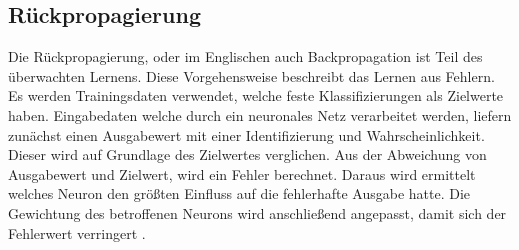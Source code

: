 \documentclass[a4paper,12pt,oneside]{article}
\begin{document}
\subsection{Rückpropagierung}
Die Rückpropagierung, oder im Englischen auch \glqq Backpropagation\grqq{} \cite{ertel2013grundkurs} ist Teil des überwachten Lernens. Diese Vorgehensweise beschreibt das Lernen aus Fehlern. Es werden Trainingsdaten verwendet, welche feste Klassifizierungen als Zielwerte haben.  Eingabedaten welche durch ein neuronales Netz verarbeitet werden, liefern zunächst einen Ausgabewert mit einer Identifizierung und Wahrscheinlichkeit. Dieser wird auf Grundlage des Zielwertes verglichen. Aus der Abweichung von Ausgabewert und Zielwert, wird ein Fehler berechnet. Daraus wird ermittelt welches Neuron den größten Einfluss auf die fehlerhafte Ausgabe hatte. Die Gewichtung des betroffenen Neurons wird anschließend angepasst, damit sich der Fehlerwert verringert \cite{goodfellow2016deep}. 
\end{document}
